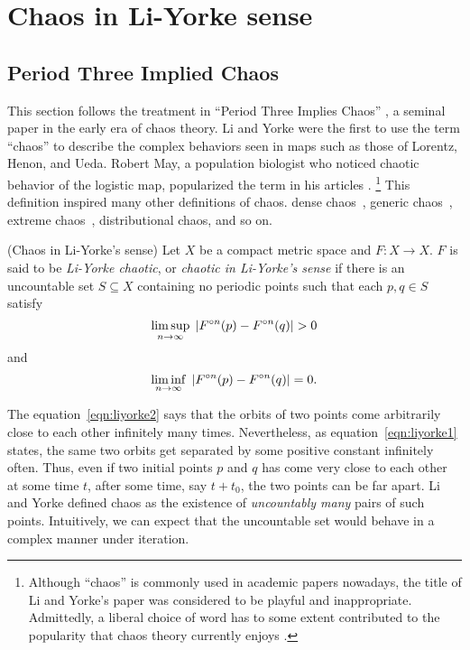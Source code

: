 \documentclass[12pt,draft,twoside]{book}
\begin{document}
\chapter{Chaos in Li-Yorke sense}

\section{Period Three Implied Chaos}
This section follows the treatment in ``Period Three Implies Chaos'' \citep{li-yorke}, a seminal paper in the early era of chaos theory.
Li and Yorke were the first to use the term ``chaos'' to describe the complex behaviors seen in maps such as those of Lorentz, Henon, and Ueda.
Robert May, a population biologist who noticed chaotic behavior of the logistic map, popularized the term in his articles \citeyearpar{may1,may2}.
\footnote{Although ``chaos'' is commonly used in academic papers nowadays, the title of Li and Yorke's paper was considered to be playful and inappropriate.
Admittedly, a liberal choice of word has to some extent contributed to the popularity that chaos theory currently enjoys \citep[``Exploring Chaos on an Interval'']{ueda-abraham}.}
This definition inspired many other definitions of chaos.
dense chaos~\citep{densechaos}, generic chaos~\citep{genericchaos}, extreme chaos~\citep{extremechaos}, distributional chaos, and so on. 

\begin{definition}
  (Chaos in Li-Yorke's sense)
  Let $X$ be a compact metric space and $F: X\to X$.
  $F$ is said to be \textit{Li-Yorke chaotic}, or 
  \textit{chaotic in Li-Yorke's sense} if there is an uncountable set $S \subseteq X$ containing no
  periodic points such that each $p,q \in S$ satisfy
  \begin{equation}
    \limsup\limits_{n \to \infty}\; \left | F^{\circ n}(p) - F^{\circ n}(q) \right | > 0
    \label{eqn:liyorke1}
  \end{equation}
  and
  \begin{equation}
    \liminf\limits_{n \to \infty}\; \left | F^{\circ n}(p) - F^{\circ n}(q) \right | = 0.
    \label{eqn:liyorke2}
  \end{equation}
\end{definition}

The equation~\eqref{eqn:liyorke2} says that the orbits of two points come arbitrarily close to each other infinitely many times.
Nevertheless, as equation~\eqref{eqn:liyorke1} states, the same two orbits get separated by some positive constant infinitely often.
Thus, even if two initial points $p$ and $q$ has come very close to each other at some time $t$, after some time, say $t + t_0$, the two points can be far apart.
Li and Yorke defined chaos as the existence of \textit{uncountably many} pairs of such points.
Intuitively, we can expect that the uncountable set would behave in a complex manner under iteration.
\end{document}

